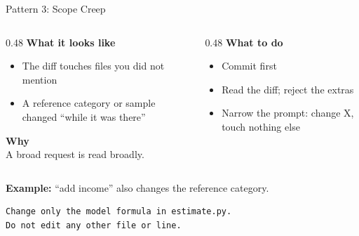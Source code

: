 \documentclass[aspectratio=169, 11pt]{beamer}
\begin{document}
\begin{frame}[fragile]{Pattern 3: Scope Creep}
  \begin{columns}[T]
    \begin{column}{0.48\textwidth}
      \textbf{What it looks like}
      \begin{itemize}
        \small
        \item The diff touches files you did not mention
        \item A reference category or sample changed ``while it was there''
      \end{itemize}
      \vspace{0.4em}
      \textbf{Why}\\[0.2em]
      {\small A broad request is read broadly.}
    \end{column}
    \begin{column}{0.48\textwidth}
      \textbf{What to do}
      \begin{itemize}
        \small
        \item Commit first
        \item Read the diff; reject the extras
        \item Narrow the prompt: change X, touch nothing else
      \end{itemize}
    \end{column}
  \end{columns}

  \vspace{0.6em}
  \textbf{Example:} ``add income'' also changes the reference category.

  \vspace{0.3em}
  \begin{lstlisting}[basicstyle=\ttfamily\footnotesize]
Change only the model formula in estimate.py.
Do not edit any other file or line.
  \end{lstlisting}
\end{frame}
\end{document}
